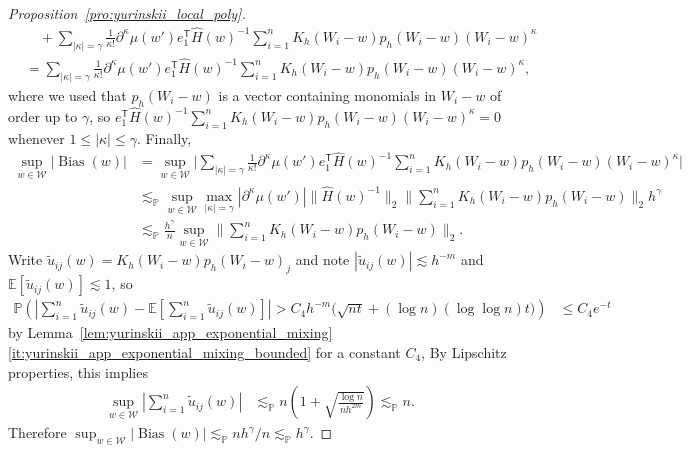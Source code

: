 \documentclass[11pt,lof]{puthesis}
\renewcommand{\P}{\ensuremath{\mathbb{P}}}
\newcommand{\E}{\ensuremath{\mathbb{E}}}
\newcommand{\cW}{\ensuremath{\mathcal{W}}}
\newcommand{\T}{\ensuremath{\mathsf{T}}}
\DeclareMathOperator{\Bias}{Bias}
\theoremstyle{break}
\theoremstyle{proof}
\newtheorem{proof}{Proof}
\begin{document}
\begin{proof}[Proposition~\ref{pro:yurinskii_local_poly}]
\begin{align*}
    &\quad+
    \sum_{|\kappa|=\gamma}
    \frac{1}{\kappa!}
    \partial^{\kappa} \mu(w')
    e_1^\T \hat H(w)^{-1}
    \sum_{i=1}^n K_h(W_i-w) p_h(W_i-w)
    (W_i-w)^\kappa \\
    &=
    \sum_{|\kappa|=\gamma}
    \frac{1}{\kappa!}
    \partial^{\kappa} \mu(w')
    e_1^\T \hat H(w)^{-1}
    \sum_{i=1}^n K_h(W_i-w) p_h(W_i-w)
    (W_i-w)^\kappa,
  \end{align*}
  where we used that
  $p_h(W_i-w)$ is a vector containing monomials
  in $W_i-w$ of order up to $\gamma$, so
  $e_1^\T \hat H(w)^{-1}
  \sum_{i=1}^n K_h(W_i-w) p_h(W_i-w)
  (W_i-w)^\kappa = 0$
  whenever $1 \leq |\kappa| \leq \gamma$.
  Finally,
  \begin{align*}
    \sup_{w\in\cW}
    |\Bias(w)|
    &=
    \sup_{w\in\cW}
    \Bigg|
    \sum_{|\kappa|=\gamma}
    \frac{1}{\kappa!}
    \partial^{\kappa} \mu(w')
    e_1^\T \hat H(w)^{-1}
    \sum_{i=1}^n K_h(W_i-w) p_h(W_i-w)
    (W_i-w)^\kappa
    \Bigg| \\
    &\lesssim_\P
    \sup_{w\in\cW}
    \max_{|\kappa| = \gamma}
    \left|
    \partial^{\kappa} \mu(w')
    \right|
    \|\hat H(w)^{-1}\|_2
    \Bigg\|
    \sum_{i=1}^n K_h(W_i-w) p_h(W_i-w)
    \Bigg\|_2
    h^\gamma \\
    &\lesssim_\P
    \frac{h^\gamma}{n}
    \sup_{w\in\cW}
    \Bigg\|
    \sum_{i=1}^n K_h(W_i-w) p_h(W_i-w)
    \Bigg\|_2.
  \end{align*}
  Write
  $\tilde u_{i j}(w) = K_h(W_i-w)p_h(W_i-w)_j$
  and note $|\tilde u_{i j}(w)| \lesssim h^{-m}$
  and $\E[\tilde u_{i j}(w)] \lesssim 1$, so
  \begin{align*}
    \P\left(
      \left|
      \sum_{i=1}^n \tilde u_{i j}(w)
      - \E\left[
        \sum_{i=1}^n \tilde u_{i j}(w)
      \right]
      \right|
      > C_4 h^{-m} \big( \sqrt{n t}
      + (\log n)(\log \log n) t \big)
    \right)
    &\leq
    C_4 e^{-t}
  \end{align*}
  by Lemma~\ref{lem:yurinskii_app_exponential_mixing}%
  \ref{it:yurinskii_app_exponential_mixing_bounded} for a constant $C_4$,
  By Lipschitz properties, this implies
  \begin{align*}
    \sup_{w \in \cW}
    \left|
    \sum_{i=1}^n \tilde u_{i j}(w)
    \right|
    &\lesssim_\P
    n
    \left(
      1 + \sqrt{\frac{\log n}{n h^{2m}}}
    \right)
    \lesssim_\P
    n.
  \end{align*}
  Therefore
  $\sup_{w\in\cW} |\Bias(w)|
  \lesssim_\P n h^\gamma / n
  \lesssim_\P h^\gamma$.


\end{proof}
\end{document}
